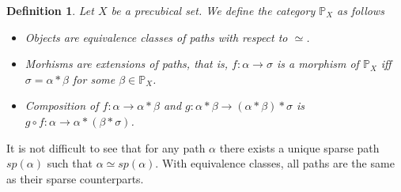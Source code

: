 \documentclass[11pt,a4paper,oldfontcommands]{memoir}
\newtheorem{definition}{Definition}
\begin{document}
\begin{definition}
    Let $X$ be a precubical set. We define the category $\mathbb{P}_{X}$ as follows
    \begin{itemize}
        \item Objects are equivalence classes of paths with respect to $\simeq$.
        \item Morhisms are extensions of paths, that is, $f:\alpha \to \sigma$ is a morphism of $\mathbb{P}_{X}$ iff $\sigma=\alpha*\beta$ for some $\beta \in \mathbb{P}_{X}$.
        \item Composition of $f:\alpha \to \alpha*\beta$ and $g: \alpha*\beta \to (\alpha*\beta)*\sigma$ is $g \circ f: \alpha \to \alpha*(\beta*\sigma)$.
    \end{itemize}
\end{definition}
 It is not difficult to see that for any path $\alpha $ there exists a unique sparse path $sp(\alpha)$ such that $\alpha \simeq sp(\alpha)$. With equivalence classes, all paths are the same as their sparse counterparts.
\end{document}
